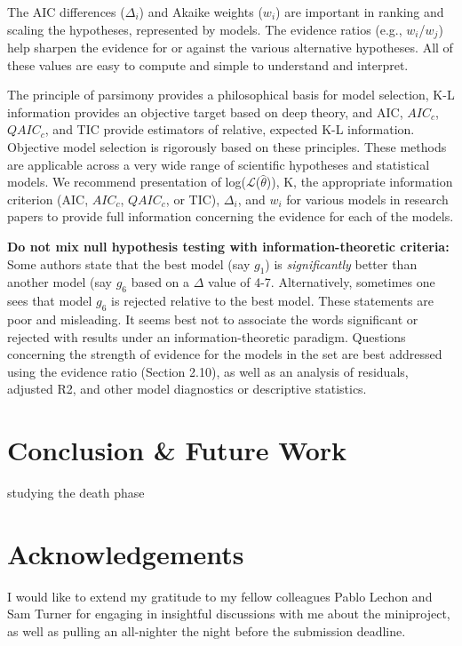\documentclass[11pt]{article}
\begin{document}
\begin{linenumbers}
	\par The AIC differences ($\Delta_i$) and Akaike weights ($w_i$) are important in ranking and scaling the hypotheses, represented by models. The evidence ratios (e.g., $w_i$/$w_j$) help sharpen the evidence for or against the various alternative hypotheses. All of these values are easy to compute and simple to understand and interpret.\\

	\par The principle of parsimony provides a philosophical basis for model selection, K-L information provides an objective target based on deep theory, and AIC, $AIC_c$, $QAIC_c$, and TIC provide estimators of relative, expected K-L information. Objective model selection is rigorously based on these principles. These methods are applicable across a very wide range of scientific hypotheses and statistical models. We recommend presentation of log($\mathcal{L}$($\hat\theta$)), K, the appropriate information criterion (AIC, $AIC_c$, $QAIC_c$, or TIC), $\Delta_i$, and $w_i$ for various models in research papers to provide full information concerning the evidence for each of the models.\\

	\par \textbf{Do not mix null hypothesis testing with information-theoretic criteria:}\\
	Some authors state that the best model (say $g_1$) is \emph{significantly} better than another model (say $g_6$ based on a $\Delta$ value of 4-7. Alternatively, sometimes one sees that model $g_6$ is rejected relative to the best model. These statements are poor and misleading. It seems best not to associate the words significant or rejected with results under an information-theoretic paradigm. Questions concerning the strength of evidence for the models in the set are best addressed using the evidence ratio (Section 2.10), as well as an analysis of residuals, adjusted R2, and other model diagnostics or descriptive statistics.

	\section{Conclusion \& Future Work}
	studying the death phase %
	
	\section{Acknowledgements}
	I would like to extend my gratitude to my fellow colleagues Pablo Lechon and Sam Turner for engaging in insightful discussions with me about the miniproject, as well as pulling an all-nighter the night before the submission deadline.
	
	\end{linenumbers}

	
    
\end{document}
